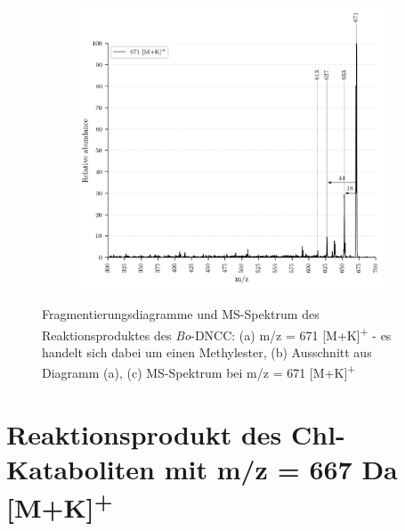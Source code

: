 \begin{figure}[!htbp]
  \begin{subfigure}[b]{\textwidth}
    \includegraphics[width=\textwidth, height=0.5\textheight]{content/Anhang/MSLeafspray/RP_Bo-DNCC/VWA_MS_LeafSpray_671.png}
    \caption{}
  \end{subfigure}
  
  \caption[Fragmentierungsdiagramme und MS-Spektrum des Reaktionsproduktes des \textit{Bo}-DNCC, Quelle: Autor]{Fragmentierungsdiagramme und MS-Spektrum des Reaktionsproduktes des \textit{Bo}-DNCC: (a) m/z = 671 [M+K]\textsuperscript{+} - es handelt sich dabei um einen Methylester, (b) Ausschnitt aus Diagramm (a), (c) MS-Spektrum bei m/z = 671 [M+K]\textsuperscript{+}}
\end{figure}

\pagebreak
\section{Reaktionsprodukt des Chl-Kataboliten mit m/z = 667 Da [M+K]\textsuperscript{+}}


